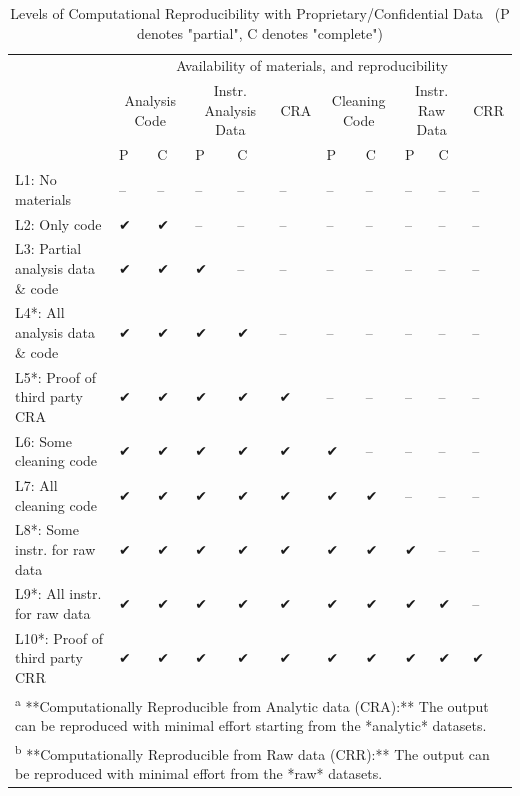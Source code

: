\documentclass[
]{book}
\begin{document}
\begin{table}

\caption{\label{tab:levels-of-computational-reproducibility-adjusted}Levels of Computational Reproducibility with Proprietary/Confidential Data \
 (P denotes "partial", C denotes "complete")}
\centering
\begin{tabular}[t]{l|l|l|l|l|l|l|l|l|l|l}
\hline
\multicolumn{1}{c|}{ } & \multicolumn{10}{c}{Availability of materials, and reproducibility} \\
\cline{2-11}
\multicolumn{1}{c|}{ } & \multicolumn{2}{c|}{Analysis Code} & \multicolumn{2}{c|}{Instr. Analysis Data} & \multicolumn{1}{c|}{CRA} & \multicolumn{2}{c|}{Cleaning Code} & \multicolumn{2}{c|}{Instr. Raw Data} & \multicolumn{1}{c}{CRR} \\
\cline{2-3} \cline{4-5} \cline{6-6} \cline{7-8} \cline{9-10} \cline{11-11}
  & P & C & P & C &   & P & C & P & C &  \\
\hline
L1: No materials & -- & -- & -- & -- & -- & -- & -- & -- & -- & --\\
\hline
L2: Only code & ✔ & ✔ & -- & -- & -- & -- & -- & -- & -- & --\\
\hline
L3: Partial analysis data \& code & ✔ & ✔ & ✔ & -- & -- & -- & -- & -- & -- & --\\
\hline
L4*: All analysis data \& code & ✔ & ✔ & ✔ & ✔ & -- & -- & -- & -- & -- & --\\
\hline
L5*: Proof of third party CRA & ✔ & ✔ & ✔ & ✔ & ✔ & -- & -- & -- & -- & --\\
\hline
L6: Some cleaning code & ✔ & ✔ & ✔ & ✔ & ✔ & ✔ & -- & -- & -- & --\\
\hline
L7: All cleaning code & ✔ & ✔ & ✔ & ✔ & ✔ & ✔ & ✔ & -- & -- & --\\
\hline
L8*: Some instr. for raw data & ✔ & ✔ & ✔ & ✔ & ✔ & ✔ & ✔ & ✔ & -- & --\\
\hline
L9*: All instr. for raw data & ✔ & ✔ & ✔ & ✔ & ✔ & ✔ & ✔ & ✔ & ✔ & --\\
\hline
L10*: Proof of third party CRR & ✔ & ✔ & ✔ & ✔ & ✔ & ✔ & ✔ & ✔ & ✔ & ✔\\
\hline
\multicolumn{11}{l}{\textsuperscript{a} **Computationally Reproducible from Analytic data (CRA):** The output can be reproduced with minimal effort starting from the *analytic* datasets.}\\
\multicolumn{11}{l}{\textsuperscript{b} **Computationally Reproducible from Raw data (CRR):** The output can be reproduced with minimal effort from the *raw* datasets.}\\
\end{tabular}
\end{table}
\end{document}
